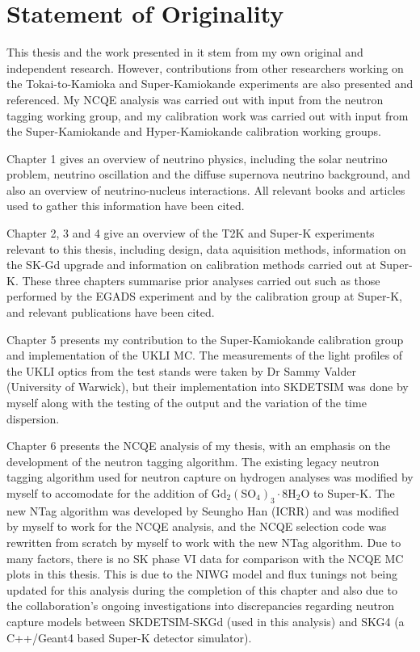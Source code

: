 \chapter*{Statement of Originality}
\thispagestyle{empty}

This thesis and the work presented in it stem from my own original and independent research. However, contributions from other researchers working on the Tokai-to-Kamioka and Super-Kamiokande experiments are also presented and referenced. My NCQE analysis was carried out with input from the neutron tagging working group, and my calibration work was carried out with input from the Super-Kamiokande and Hyper-Kamiokande calibration working groups.

Chapter 1 gives an overview of neutrino physics, including the solar neutrino problem, neutrino oscillation and the diffuse supernova neutrino background, and also an overview of neutrino-nucleus interactions. All relevant books and articles used to gather this information have been cited.

Chapter 2, 3 and 4 give an overview of the T2K and Super-K experiments relevant to this thesis, including design, data aquisition methods, information on the SK-Gd upgrade and information on calibration methods carried out at Super-K. These three chapters summarise prior analyses carried out such as those performed by the EGADS experiment and by the calibration group at Super-K, and relevant publications have been cited. 

Chapter 5 presents my contribution to the Super-Kamiokande calibration group and implementation of the UKLI MC. The measurements of the light profiles of the UKLI optics from the test stands were taken by Dr Sammy Valder (University of Warwick), but their implementation into SKDETSIM was done by myself along with the testing of the output and the variation of the time dispersion. 

Chapter 6 presents the NCQE analysis of my thesis, with an emphasis on the development of the neutron tagging algorithm. The existing legacy neutron tagging algorithm used for neutron capture on hydrogen analyses was modified by myself to accomodate for the addition of $\mathrm{Gd}_{2}\left(\mathrm{SO}_{4}\right)_{3} \cdot 8 \mathrm{H}_{2} \mathrm{O}$ to Super-K. The new NTag algorithm was developed by Seungho Han (ICRR) and was modified by myself to work for the NCQE analysis, and the NCQE selection code was rewritten from scratch by myself to work with the new NTag algorithm. Due to many factors, there is no SK phase VI data for comparison with the NCQE MC plots in this thesis. This is due to the NIWG model and flux tunings not being updated for this analysis during the completion of this chapter and also due to the collaboration's ongoing investigations into discrepancies regarding neutron capture models between SKDETSIM-SKGd (used in this analysis) and SKG4 (a C++/Geant4 based Super-K detector simulator). 

